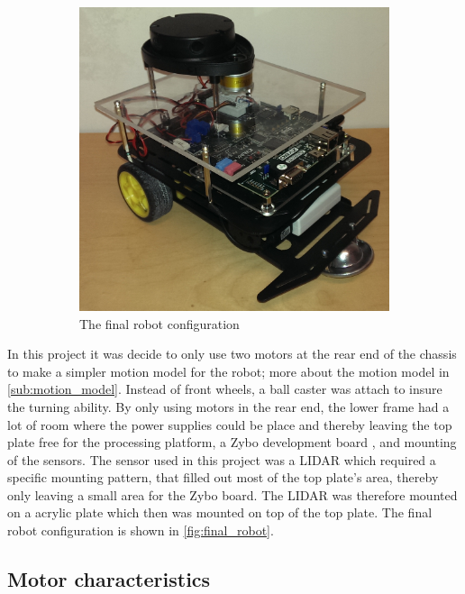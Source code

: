 \documentclass[Main]{subfiles}
\begin{document}
\begin{figure}[H]
\begin{subfigure}[b]{0.4\linewidth}
				\includegraphics[width=1\linewidth]{./Figures/final_robot.png}
				\caption{The final robot configuration}
				\label{fig:final_robot}
			\end{subfigure}
		\caption{}
		\label{fig:robots}
		\end{figure}
		In this project it was decide to only use two motors at the rear end of the chassis to make a simpler motion model for the robot; more about the motion model in \autoref{sub:motion_model}. 
		Instead of front wheels, a ball caster was attach to insure the turning ability. 
		By only using motors in the rear end, the lower frame had a lot of room where the power supplies could be place and thereby leaving the top plate free for the processing platform, a Zybo development board , and mounting of the sensors. 
		The sensor used in this project was a LIDAR  which required a specific mounting pattern, that filled out most of the top plate's area, thereby only leaving a small area for the Zybo board. 
		The LIDAR was therefore mounted on a acrylic plate which then was mounted on top of the top plate. 
		The final robot configuration is shown in \autoref{fig:final_robot}.
		

	\subsection{Motor characteristics} %
	\label{sub:motor_characteristics}
\end{document}
